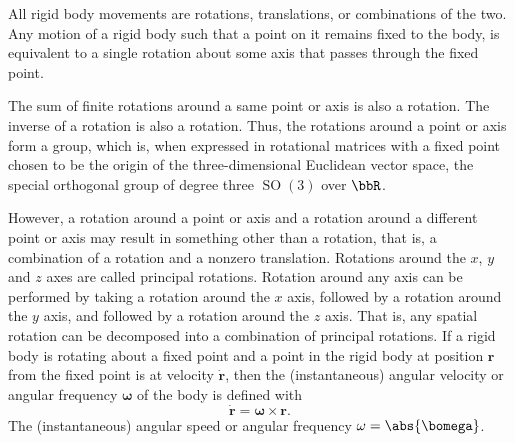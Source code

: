 \documentclass[a4paper,12pt]{article}
\begin{document}
All rigid body movements are rotations, translations, or combinations of the two.
Any motion of a rigid body such that a point on it remains fixed to the body, is equivalent to a single rotation about some axis that passes through the fixed point.

The sum of finite rotations around a same point or axis is also a rotation. The inverse of a rotation is also a rotation. Thus, the rotations around a point or axis form a group, which is, when expressed in rotational matrices with a fixed point chosen to be the origin of the three-dimensional Euclidean vector space, the special orthogonal group of degree three $\operatorname{SO}(3)$ over $\bbR$.

However, a rotation around a point or axis and a rotation around a different point or axis may result in something other than a rotation, that is, a  combination of a rotation and a nonzero translation.
Rotations around the $x$, $y$ and $z$ axes are called principal rotations. Rotation around any axis can be performed by taking a rotation around the $x$ axis, followed by a rotation around the $y$ axis, and followed by a rotation around the $z$ axis. That is, any spatial rotation can be decomposed into a combination of principal rotations.
If a rigid body is rotating about a fixed point and a point in the rigid body at position $\mathbf{r}$ from the fixed point is at velocity $\dot{\mathbf{r}}$, then the (instantaneous) angular velocity or angular frequency $\boldsymbol{\omega}$ of the body is defined with
\[\dot{\mathbf{r}}=\boldsymbol{\omega}\times\mathbf{r}.\]
The (instantaneous) angular speed or angular frequency $\omega=\abs{\bomega}$.
\end{document}
